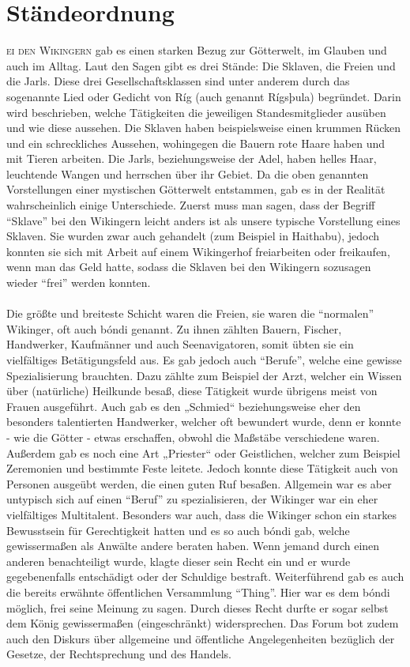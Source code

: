 \documentclass[12pt,a4paper,ngerman,openany]{book}
\newcommand{\flettrine}[2]{\lettrine[lines=2, depth=0, loversize=0.25, nindent=0.69pt, lraise=0.15]{\initfamily{#1}}{#2}}
\newcommand*\initfamily{\usefont{U}{GotIn}{xl}{n}}
\begin{document}
\section{Ständeordnung}
\flettrine{B}{ei den Wikingern} gab es einen starken Bezug zur Götterwelt, im Glauben und auch im Alltag.
Laut den Sagen gibt es drei Stände: Die Sklaven, die Freien und die Jarls.
Diese drei Gesellschaftsklassen sind unter anderem durch das sogenannte Lied oder Gedicht von Ríg (auch genannt Rígsþula) begründet. Darin wird beschrieben, welche Tätigkeiten die jeweiligen Standesmitglieder ausüben und wie diese aussehen.
Die Sklaven haben beispielsweise einen krummen Rücken und ein schreckliches Aussehen, wohingegen die Bauern rote Haare haben und mit Tieren arbeiten. Die Jarls, beziehungsweise der Adel, haben helles Haar, leuchtende Wangen und herrschen über ihr Gebiet.
Da die oben genannten Vorstellungen einer mystischen Götterwelt entstammen, gab es in der Realität wahrscheinlich einige Unterschiede.
Zuerst muss man sagen, dass der Begriff “Sklave” bei den Wikingern leicht anders ist als unsere typische Vorstellung eines Sklaven. Sie wurden zwar auch gehandelt (zum Beispiel in Haithabu), jedoch konnten sie sich mit Arbeit auf einem Wikingerhof freiarbeiten oder freikaufen, wenn man das Geld hatte, sodass die Sklaven bei den Wikingern sozusagen wieder “frei” werden konnten.\\\\
Die größte und breiteste Schicht waren die Freien, sie waren die “normalen” Wikinger, oft auch bóndi genannt. Zu ihnen zählten Bauern, Fischer, Handwerker, Kaufmänner und auch Seenavigatoren, somit übten sie ein vielfältiges Betätigungsfeld aus.
Es gab jedoch auch “Berufe”, welche eine gewisse Spezialisierung brauchten. Dazu zählte zum Beispiel der Arzt, welcher ein Wissen über (natürliche) Heilkunde besaß, diese Tätigkeit wurde übrigens meist von Frauen ausgeführt. Auch gab es den „Schmied“ beziehungsweise eher den besonders talentierten Handwerker, welcher oft bewundert wurde, denn er konnte - wie die Götter - etwas erschaffen, obwohl die Maßstäbe verschiedene waren.
Außerdem gab es noch eine Art „Priester“ oder Geistlichen, welcher zum Beispiel Zeremonien und bestimmte Feste leitete. Jedoch konnte diese Tätigkeit auch von Personen ausgeübt werden, die einen guten Ruf besaßen.
Allgemein war es aber untypisch sich auf einen “Beruf” zu spezialisieren, der Wikinger war ein eher vielfältiges Multitalent.
Besonders war auch, dass die Wikinger schon ein starkes Bewusstsein für Gerechtigkeit hatten und es so auch bóndi gab, welche gewissermaßen als Anwälte andere beraten haben. Wenn jemand durch einen anderen benachteiligt wurde, klagte dieser sein Recht ein und er wurde gegebenenfalls entschädigt oder der Schuldige bestraft. Weiterführend gab es auch die bereits erwähnte öffentlichen Versammlung “Thing”. Hier war es dem bóndi möglich, frei seine Meinung zu sagen. Durch dieses Recht durfte er sogar selbst dem König gewissermaßen (eingeschränkt) widersprechen. Das Forum bot zudem auch den Diskurs über allgemeine und öffentliche Angelegenheiten bezüglich der Gesetze, der Rechtsprechung und des Handels.
\end{document}

